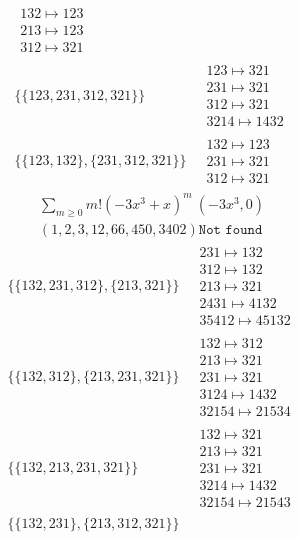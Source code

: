 \begin{scriptsize}
\begin{align}
\begin{matrix}
132 \mapsto 123\\213 \mapsto 123\\312 \mapsto 321
\end{matrix}
\\
\{\{123, 231, 312, 321\}\}
\ 
&
\begin{matrix}
123 \mapsto 321\\231 \mapsto 321\\312 \mapsto 321\\3214 \mapsto 1432
\end{matrix}
\\
\{\{123, 132\}, \{231, 312, 321\}\}
\ 
&
\begin{matrix}
132 \mapsto 123\\231 \mapsto 321\\312 \mapsto 321
\end{matrix}
\end{align}
$$
\begin{matrix}
\sum_{m \geq 0} m! \left(
-3 x^{3} + x
\right)^m
\ 
\left(-3 x^{3}, 0\right)
\\
\left(1, 2, 3, 12, 66, 450, 3402\right)
\texttt{Not found}
\end{matrix}
$$
\begin{align}
\{\{132, 231, 312\}, \{213, 321\}\}
\ 
&
\begin{matrix}
231 \mapsto 132\\312 \mapsto 132\\213 \mapsto 321\\2431 \mapsto 4132\\35412 \mapsto 45132
\end{matrix}
\\
\{\{132, 312\}, \{213, 231, 321\}\}
\ 
&
\begin{matrix}
132 \mapsto 312\\213 \mapsto 321\\231 \mapsto 321\\3124 \mapsto 1432\\32154 \mapsto 21534
\end{matrix}
\\
\{\{132, 213, 231, 321\}\}
\ 
&
\begin{matrix}
132 \mapsto 321\\213 \mapsto 321\\231 \mapsto 321\\3214 \mapsto 1432\\32154 \mapsto 21543
\end{matrix}
\\
\{\{132, 231\}, \{213, 312, 321\}\}

\end{align}
\end{scriptsize}
